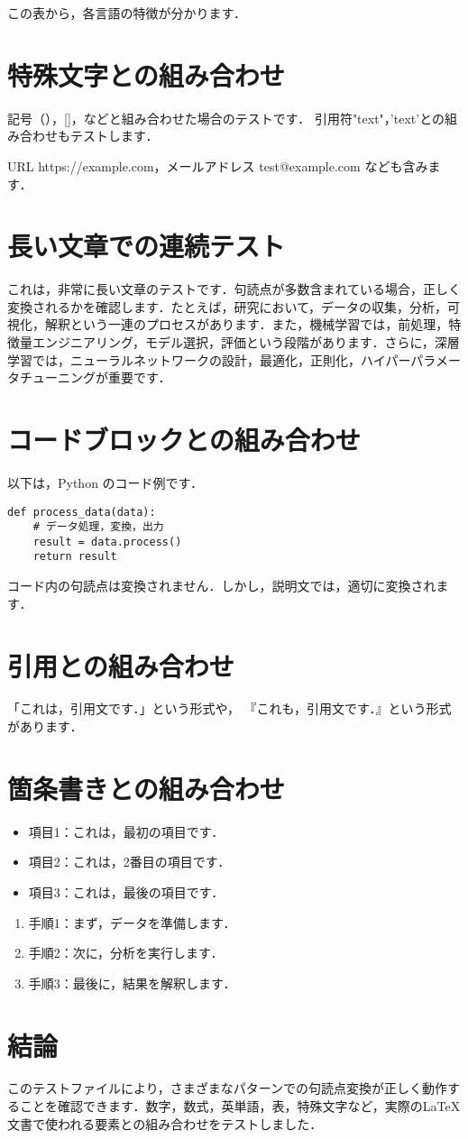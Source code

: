 \documentclass{article}
\begin{document}
この表から，各言語の特徴が分かります．

\section{特殊文字との組み合わせ}

記号（），[]，{}などと組み合わせた場合のテストです．
引用符"text"，'text'との組み合わせもテストします．

URL https://example.com，メールアドレス test@example.com なども含みます．

\section{長い文章での連続テスト}

これは，非常に長い文章のテストです．句読点が多数含まれている場合，正しく変換されるかを確認します．たとえば，研究において，データの収集，分析，可視化，解釈という一連のプロセスがあります．また，機械学習では，前処理，特徴量エンジニアリング，モデル選択，評価という段階があります．さらに，深層学習では，ニューラルネットワークの設計，最適化，正則化，ハイパーパラメータチューニングが重要です．

\section{コードブロックとの組み合わせ}

以下は，Python のコード例です．

\begin{verbatim}
def process_data(data):
    # データ処理，変換，出力
    result = data.process()
    return result
\end{verbatim}

コード内の句読点は変換されません．しかし，説明文では，適切に変換されます．

\section{引用との組み合わせ}

「これは，引用文です．」という形式や，
『これも，引用文です．』という形式があります．

\section{箇条書きとの組み合わせ}

\begin{itemize}
\item 項目1：これは，最初の項目です．
\item 項目2：これは，2番目の項目です．
\item 項目3：これは，最後の項目です．
\end{itemize}

\begin{enumerate}
\item 手順1：まず，データを準備します．
\item 手順2：次に，分析を実行します．
\item 手順3：最後に，結果を解釈します．
\end{enumerate}

\section{結論}

このテストファイルにより，さまざまなパターンでの句読点変換が正しく動作することを確認できます．数字，数式，英単語，表，特殊文字など，実際のLaTeX文書で使われる要素との組み合わせをテストしました．
\end{document}
